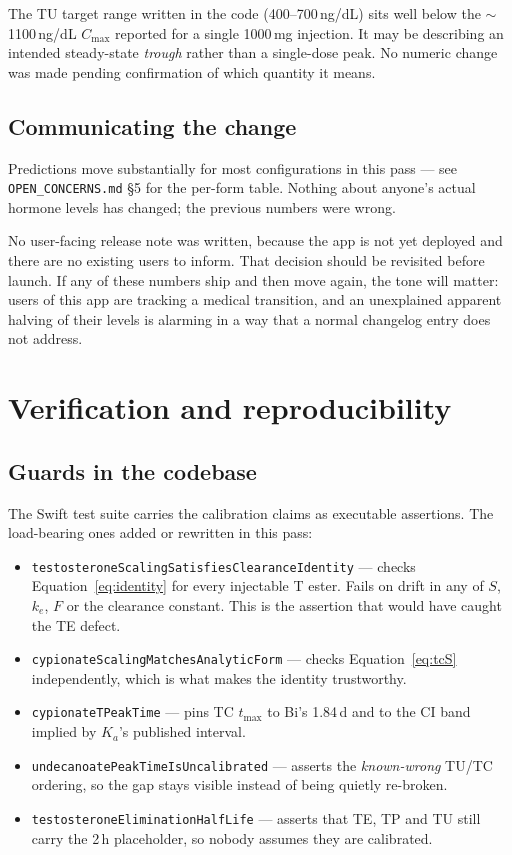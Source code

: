 \documentclass[11pt,a4paper]{article}
\newcommand{\code}[1]{\texttt{\small #1}}
\begin{document}
The TU target range written in the code (400--700\,ng/dL) sits well below the
$\sim$1100\,ng/dL $C_{\max}$ reported for a single 1000\,mg injection. It may be
describing an intended steady-state \emph{trough} rather than a single-dose peak.
No numeric change was made pending confirmation of which quantity it means.

\subsection{Communicating the change}

Predictions move substantially for most configurations in this pass --- see
\code{OPEN\_CONCERNS.md} \S5 for the per-form table. Nothing about anyone's actual
hormone levels has changed; the previous numbers were wrong.

No user-facing release note was written, because the app is not yet deployed and
there are no existing users to inform. That decision should be revisited before
launch. If any of these numbers ship and then move again, the tone will matter:
users of this app are tracking a medical transition, and an unexplained apparent
halving of their levels is alarming in a way that a normal changelog entry does
not address.

\section{Verification and reproducibility}

\subsection{Guards in the codebase}

The Swift test suite carries the calibration claims as executable assertions.
The load-bearing ones added or rewritten in this pass:

\begin{itemize}[nosep,leftmargin=1.4em]
\item \code{testosteroneScalingSatisfiesClearanceIdentity} --- checks
      Equation~\ref{eq:identity} for every injectable T ester. Fails on drift in
      any of $S$, $k_e$, $F$ or the clearance constant. This is the assertion that
      would have caught the TE defect.
\item \code{cypionateScalingMatchesAnalyticForm} --- checks
      Equation~\ref{eq:tcS} independently, which is what makes the identity
      trustworthy.
\item \code{cypionateTPeakTime} --- pins TC $t_{\max}$ to Bi's 1.84\,d and to the
      CI band implied by $K_a$'s published interval.
\item \code{undecanoatePeakTimeIsUncalibrated} --- asserts the \emph{known-wrong}
      TU/TC ordering, so the gap stays visible instead of being quietly
      re-broken.
\item \code{testosteroneEliminationHalfLife} --- asserts that TE, TP and TU still
      carry the 2\,h placeholder, so nobody assumes they are calibrated.
\end{itemize}
\end{document}
